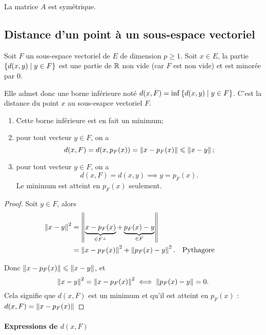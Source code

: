 La matrice \(A\) est symétrique.

\subsection{Distance d'un point à un sous-espace vectoriel}

Soit \(F\) un sous-espace vectoriel de \(E\) de dimension \(p \geqslant 1\). 
Soit \(x \in E\), la partie \(\left\{d(x,y)\mathrel{}\middle|\mathrel{}y \in F\right\}\) est une partie de 
\(\mathbb{R}\) non vide (car \(F\) est non vide) et est minorée par \(0\).

Elle admet donc une borne inférieure noté \(d(x,F)=\inf\left\{d(x,y)\mathrel{}\middle|\mathrel{}y \in 
F\right\}\). C'est la distance du point \(x\) au sous-esapce vectoriel \(F\).

\begin{theo}
  \begin{enumerate}
    \item Cette borne inférieure est en fait un minimum;
    \item pour tout vecteur \(y \in F\), on a
      \begin{equation}
        d(x,F) = d(x,p_F(x)) = \left\lVert x-p_F(x)\right\rVert \leqslant \left\lVert x-y\right\rVert;    
      \end{equation}
    \item pour tout vecteur \(y \in F\), on a
      \begin{equation}
        d(x,F) = d(x,y) \implies y=p_F(x).
      \end{equation}
      Le minimum est atteint en \(p_F(x)\) seulement.
  \end{enumerate}
\end{theo}
\begin{proof}
  Soit \(y \in F\), alors
  \begin{align}
    \left\lVert x-y\right\rVert^2 &=\left\lVert\underbrace{x-p_F(x)}_{\in F^\perp} + 
    \underbrace{p_F(x)-y}_{\in F}\right\rVert\\
    &=\left\lVert x-p_F(x)\right\rVert^2 + \left\lVert p_F(x)-y\right\rVert^2. && \text{Pythagore}
  \end{align}

  Donc \(\left\lVert x-p_F(x)\right\rVert \leqslant \left\lVert x-y\right\rVert\), et
  \begin{equation}
    \left\lVert x-y\right\rVert^2 = \left\lVert x-p_F(x)\right\rVert^2 \iff  \left\lVert p_F(x)-y\right\rVert=0.
  \end{equation}
  Cela signifie que \(d(x,F)\) est un minimum et qu'il est atteint en 
  \(p_F(x)\) : \(d(x,F)=\left\lVert x-p_F(x)\right\rVert\)
\end{proof}

\paragraph{Expressions de \(d(x,F)\)}

